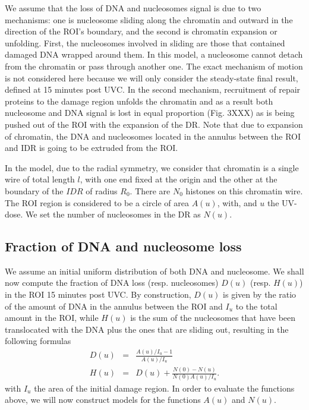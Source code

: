 \documentclass[12pt]{article}
\begin{document}
We assume that the loss of DNA and nucleosomes signal is due to two mechanisms: one is nucleosome sliding along the chromatin and outward in the direction of the ROI's boundary, and the second is chromatin expansion or unfolding. First, the nucleosomes involved in sliding are those that contained damaged DNA wrapped around them. In this model, a nucleosome cannot detach from the chromatin or pass through another one. The exact mechanism of motion is not considered here because we will only consider the steady-state final result, defined at 15 minutes post UVC. In the second mechanism, recruitment of repair proteins to the damage region unfolds the chromatin and as a result  both nucleosome and DNA signal is lost in equal proportion (Fig. 3XXX) as is being pushed out of the ROI with the expansion of the DR. Note that due to expansion of chromatin, the DNA and nucleosomes located in the annulus between the ROI and IDR is going to be extruded from the ROI.

In the model, due to the radial symmetry, we consider that chromatin is a single wire of total length $l$, with one end fixed at the origin and the other at the boundary of the $IDR$ of radius $R_0$. There are $N_0$ histones on this chromatin wire.  The ROI region is considered to be a circle of area $A(u)$, with, and $u$ the UV-dose. We set the number of nucleosomes in the DR as $N(u)$.

\subsection{Fraction of DNA and nucleosome loss }\label{subsection:fractionOfDNAandNucleosomeLoss}
We assume an initial uniform distribution of both DNA and nucleosome. 
We shall now compute the fraction of DNA loss (resp. nucleosomes) $D(u)$ (resp. $H(u)$) in the ROI 15 minutes post UVC. By construction, $D(u)$ is given by the ratio of the amount of DNA in the annulus between the ROI and $I_u$ to the total amount in the ROI, while $H(u)$ is the sum of the nucleosomes that have been translocated with the DNA plus the ones that are sliding out, resulting in the following formulas
\begin{eqnarray*}
D(u)&=& \frac{A(u)/I_u -1}{A(u)/I_u} \\
H(u)&=&D(u)+\frac{N(0)-N(u)}{N(0)A(u)/I_u}.
\end{eqnarray*}
with $I_u$ the area of the initial damage region.
In order to evaluate the functions above, we will now construct models for the functions $A(u)$ and $N(u)$.
\end{document}

